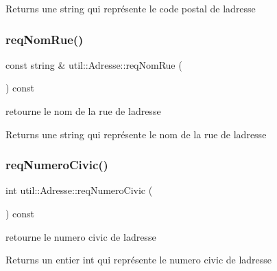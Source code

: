 \begin{DoxyReturn}{Returns}
une string qui représente le code postal de l\textquotesingle{}adresse 
\end{DoxyReturn}
\mbox{\label{classutil_1_1Adresse_aa6446c6a166a7ef16700ce5098df4337}} 
\subsubsection{\texorpdfstring{req\+Nom\+Rue()}{reqNomRue()}}
{\footnotesize\ttfamily const string \& util\+::\+Adresse\+::req\+Nom\+Rue (\begin{DoxyParamCaption}{ }\end{DoxyParamCaption}) const}



retourne le nom de la rue de l\textquotesingle{}adresse 

\begin{DoxyReturn}{Returns}
une string qui représente le nom de la rue de l\textquotesingle{}adresse 
\end{DoxyReturn}
\mbox{\label{classutil_1_1Adresse_a5b5472020a325014c0296819beba184b}} 
\subsubsection{\texorpdfstring{req\+Numero\+Civic()}{reqNumeroCivic()}}
{\footnotesize\ttfamily int util\+::\+Adresse\+::req\+Numero\+Civic (\begin{DoxyParamCaption}{ }\end{DoxyParamCaption}) const}



retourne le numero civic de l\textquotesingle{}adresse 

\begin{DoxyReturn}{Returns}
un entier int qui représente le numero civic de l\textquotesingle{}adresse 
\end{DoxyReturn}
\mbox{\label{classutil_1_1Adresse_a9f6048ebc5b0e8bf9a329eb8d9ec2de4}} 
